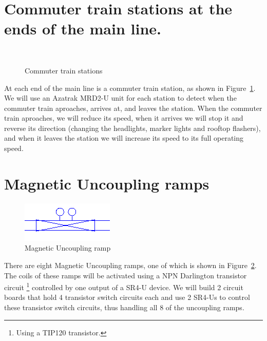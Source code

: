 \section{Commuter train stations at the ends of the main line.}

\begin{figure}[hbpt]
\begin{centering}
\mbox{\quad
      }
\caption{Commuter train stations}
\label{fig:TheLayout:SwitchTestDemo-CommuterStations}
\end{centering}
\end{figure}
At each end of the main line is a commuter train station, as shown in
Figure~\ref{fig:TheLayout:SwitchTestDemo-CommuterStations}. We will use an
Azatrak MRD2-U unit for each station to detect when the commuter train
aproaches, arrives at, and leaves the station.  When the commuter train
aproaches, we will reduce its speed, when it arrives we will stop it and
reverse its direction (changing the headlights, marker lights and
rooftop flashers), and when it leaves the station we will increase its
speed to its full operating speed.


\section{Magnetic Uncoupling ramps}

\begin{figure}[hbpt]
\begin{centering}
\includegraphics{SwitchTestDemo-UncouplingRamp.png}
\caption{Magnetic Uncoupling ramp}
\label{fig:TheLayout:SwitchTestDemo-UncouplingRamp}
\end{centering}
\end{figure}
There are eight Magnetic Uncoupling ramps, one of which is shown in
Figure~\ref{fig:TheLayout:SwitchTestDemo-UncouplingRamp}.  The coils of
these ramps will be activated using a NPN Darlington transistor circuit
\footnote{Using a TIP120 transistor.} controlled by one output of a
SR4-U device. We will build 2 circuit boards that hold 4 transistor switch
circuits each and use 2 SR4-Us to control these transistor switch
circuits, thus handling all 8 of the uncoupling ramps.

